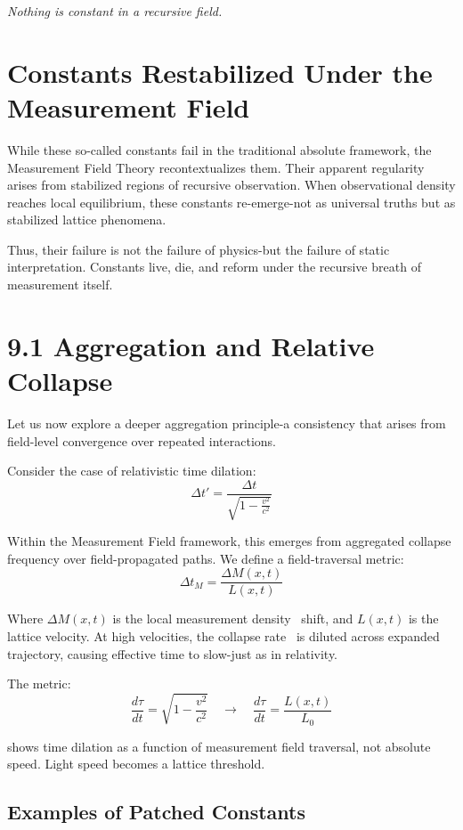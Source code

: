 \begin{flushright}
\textit{Nothing is constant in a recursive field.}
\end{flushright}

\section*{Constants Restabilized Under the Measurement Field}

While these so-called constants fail in the traditional absolute framework, the Measurement Field Theory recontextualizes them. Their apparent regularity arises from stabilized regions of recursive observation. When observational density reaches local equilibrium, these constants re-emerge-not as universal truths but as stabilized lattice phenomena.

Thus, their failure is not the failure of physics-but the failure of static interpretation. Constants live, die, and reform under the recursive breath of measurement itself.

\section*{9.1 Aggregation and Relative Collapse}

Let us now explore a deeper aggregation principle-a consistency that arises from field-level convergence over repeated interactions.

Consider the case of relativistic time dilation:
\[ \Delta t' = \frac{\Delta t}{\sqrt{1 - \frac{v^2}{c^2}}} \]

Within the Measurement Field framework, this emerges from aggregated collapse frequency over field-propagated paths. We define a field-traversal metric:
\[ \Delta t_M = \frac{\Delta M(x,t)}{L(x,t)} \]

Where $\Delta M(x,t)$ is the local measurement density~\cite{joos1985emergence} shift, and $L(x,t)$ is the lattice velocity. At high velocities, the collapse rate~\cite{penrose1996gravity} is diluted across expanded trajectory, causing effective time to slow-just as in relativity.

The metric:
\[ \frac{d\tau}{dt} = \sqrt{1 - \frac{v^2}{c^2}} \quad \rightarrow \quad \frac{d\tau}{dt} = \frac{L(x,t)}{L_0} \]

shows time dilation as a function of measurement field traversal, not absolute speed. Light speed becomes a lattice threshold.

\subsection*{Examples of Patched Constants}

